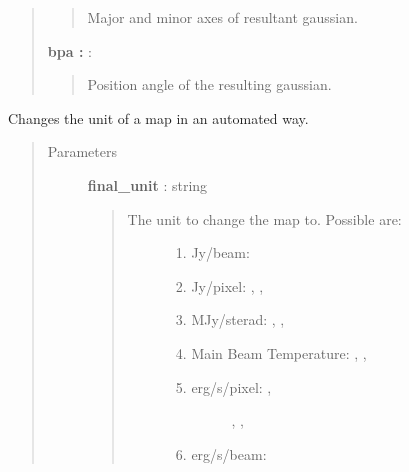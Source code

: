 \documentclass[a4paper,10pt,english]{sphinxmanual}
\begin{document}
\begin{fulllineitems}
\begin{fulllineitems}
\begin{quote}
\begin{description}
\begin{quote}
Major and minor axes of resultant gaussian.
\end{quote}

\textbf{bpa :} :
\begin{quote}

Position angle of the resulting gaussian.
\end{quote}

\end{description}\end{quote}

\end{fulllineitems}


\begin{fulllineitems}
\label{maps:astrolyze.maps.fits.FitsMap.change_unit}
Changes the unit of a map in an automated way.
\begin{quote}\begin{description}
\item[{Parameters }] \leavevmode
\textbf{final\_unit} : string
\begin{quote}
\begin{description}
\item[{The unit to change the map to. Possible are:}] \leavevmode\begin{enumerate}
\item {} 
Jy/beam:  

\item {} 
Jy/pixel: , , 

\item {} 
MJy/sterad: , , 

\item {} 
Main Beam Temperature: , , 

\item {} \begin{description}
\item[{erg/s/pixel:  ,}] \leavevmode
{}, ,

\end{description}

\item {} 
erg/s/beam: 


\end{enumerate}
\end{description}
\end{quote}
\end{description}
\end{quote}
\end{fulllineitems}
\end{fulllineitems}
\end{document}
